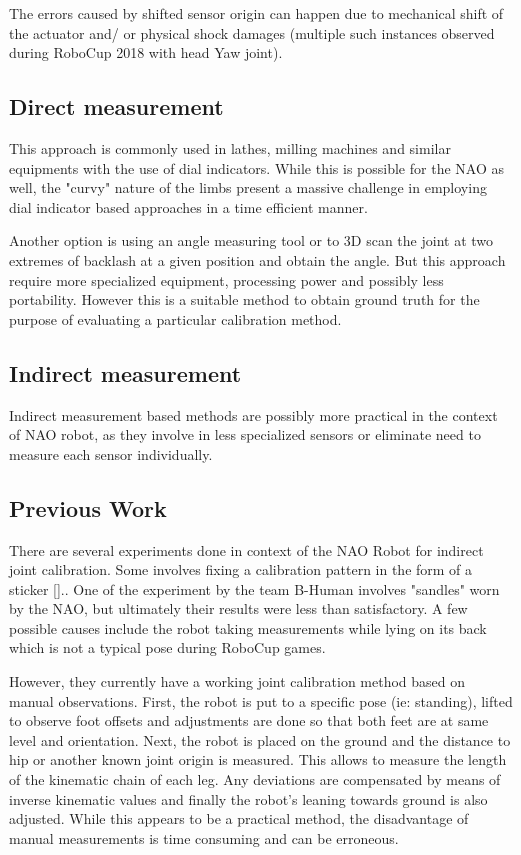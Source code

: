 \documentclass[english, printversion, nomenclature, notitle]{tuvisionthesis} %
\begin{document}
The errors caused by shifted sensor origin can happen due to mechanical shift of the actuator and/ or physical shock damages (multiple such instances observed during RoboCup 2018 with head Yaw joint).

\subsection{Direct measurement}

This approach is commonly used in lathes, milling machines and similar equipments with the use of dial indicators. While this is possible for the NAO as well, the "curvy" nature of the limbs present a massive challenge in employing dial indicator based approaches in a time efficient manner.

Another option is using an angle measuring tool or to 3D scan the joint at  two extremes of backlash at a given position and obtain the angle. But this approach require more specialized equipment, processing power and possibly less portability. However this is a suitable method to obtain ground truth for the purpose of evaluating a particular calibration method. 

\subsection{Indirect measurement}
Indirect measurement based methods are possibly more practical in the context of NAO robot, as they involve in less specialized sensors or eliminate need to measure each sensor individually.

\subsection{Previous Work}

There are several experiments done in context of the NAO Robot for indirect joint calibration. Some involves fixing a calibration pattern in the form of a sticker [].. One of the experiment by the team B-Human involves "sandles" worn by the NAO, but ultimately their results were less than satisfactory. A few possible causes include the robot taking measurements while lying on its back which is not a typical pose during RoboCup games. 

However, they currently have a working joint calibration method based on manual observations. First, the robot is put to a specific pose (ie: standing), lifted to observe foot offsets and adjustments are done so that both feet are at same level and orientation. Next, the robot is placed on the ground and the distance to hip or another known joint origin is measured. This allows to measure the length of the kinematic chain of each leg. Any deviations are compensated by means of inverse kinematic values and finally the robot's leaning  towards ground is also adjusted. While this appears to be a practical method, the disadvantage of manual measurements is time consuming and can be erroneous.
\end{document}
